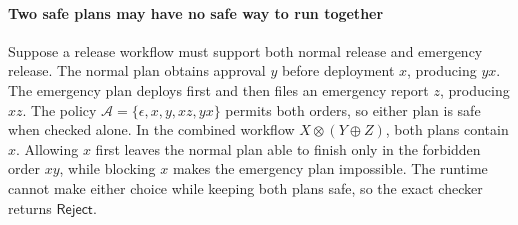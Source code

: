 \paragraph{Two safe plans may have no safe way to run together}
Suppose a release workflow must support both normal release and emergency release.
The normal plan obtains approval \(y\) before deployment \(x\), producing \(yx\).
The emergency plan deploys first and then files an emergency report \(z\), producing \(xz\).
The policy \(\mathcal A=\{\epsilon,x,y,xz,yx\}\) permits both orders, so either plan is safe when checked alone.
In the combined workflow \(X\otimes(Y\oplus Z)\), both plans contain \(x\).
Allowing \(x\) first leaves the normal plan able to finish only in the forbidden order \(xy\), while blocking \(x\) makes the emergency plan impossible.
The runtime cannot make either choice while keeping both plans safe, so the exact checker returns \(\mathsf{Reject}\).


